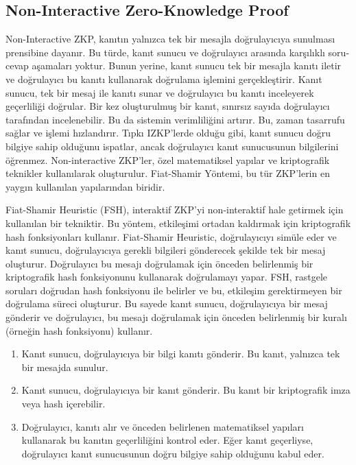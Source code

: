 \newpage

\subsection{Non-Interactive Zero-Knowledge Proof}

Non-Interactive ZKP, kanıtın yalnızca tek bir mesajla doğrulayıcıya sunulması prensibine dayanır. Bu türde, kanıt sunucu ve doğrulayıcı arasında karşılıklı soru-cevap aşamaları yoktur. Bunun yerine, kanıt sunucu tek bir mesajla kanıtı iletir ve doğrulayıcı bu kanıtı kullanarak doğrulama işlemini gerçekleştirir. Kanıt sunucu, tek bir mesaj ile kanıtı sunar ve doğrulayıcı bu kanıtı inceleyerek geçerliliği doğrular. Bir kez oluşturulmuş bir kanıt, sınırsız sayıda doğrulayıcı tarafından incelenebilir. Bu da sistemin verimliliğini artırır. Bu, zaman tasarrufu sağlar ve işlemi hızlandırır. Tıpkı IZKP'lerde olduğu gibi, kanıt sunucu doğru bilgiye sahip olduğunu ispatlar, ancak doğrulayıcı kanıt sunucusunun bilgilerini öğrenmez. Non-interactive ZKP'ler,  özel matematiksel yapılar ve kriptografik teknikler kullanılarak oluşturulur. Fiat-Shamir Yöntemi, bu tür ZKP'lerin en yaygın kullanılan yapılarından biridir.

Fiat-Shamir Heuristic (FSH), interaktif ZKP'yi non-interaktif hale getirmek için kullanılan bir tekniktir. Bu yöntem, etkileşimi ortadan kaldırmak için kriptografik hash fonksiyonları kullanır. Fiat-Shamir Heuristic, doğrulayıcıyı simüle eder ve kanıt sunucu, doğrulayıcıya gerekli bilgileri gönderecek şekilde tek bir mesaj oluşturur. Doğrulayıcı bu mesajı doğrulamak için önceden belirlenmiş bir kriptografik hash fonksiyonunu kullanarak doğrulamayı yapar. FSH, rastgele soruları doğrudan hash fonksiyonu ile belirler ve bu, etkileşim gerektirmeyen bir doğrulama süreci oluşturur. Bu sayede kanıt sunucu, doğrulayıcıya bir mesaj gönderir ve doğrulayıcı, bu mesajı doğrulamak için önceden belirlenmiş bir kuralı (örneğin hash fonksiyonu) kullanır.

\begin{enumerate}
    \item Kanıt sunucu, doğrulayıcıya bir bilgi kanıtı gönderir. Bu kanıt, yalnızca tek bir mesajda sunulur.
    \item Kanıt sunucu, doğrulayıcıya bir kanıt gönderir. Bu kanıt bir kriptografik imza veya hash içerebilir.
    \item Doğrulayıcı, kanıtı alır ve önceden belirlenen matematiksel yapıları kullanarak bu kanıtın geçerliliğini kontrol eder. Eğer kanıt geçerliyse, doğrulayıcı kanıt sunucusunun doğru bilgiye sahip olduğunu kabul eder.
\end{enumerate}

